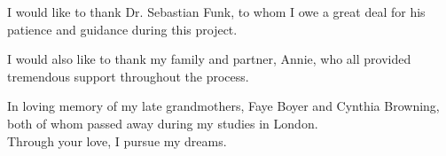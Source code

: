 \documentclass[../Paper.tex]{subfiles}
\begin{document}
  \justifying
  I would like to thank Dr. Sebastian Funk, to whom I owe a great deal for his
  patience and guidance during this project.

  I would also like to thank my family and partner, Annie, who all provided
  tremendous support throughout the process.

  In loving memory of my late grandmothers, Faye Boyer and Cynthia Browning, both
  of whom passed away during my studies in London. \\
  Through your love, I pursue my dreams.
  \clearpage
\end{document}
